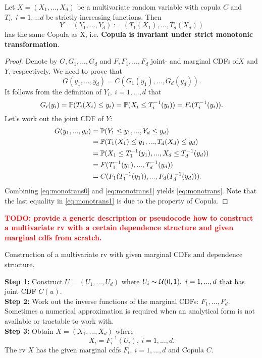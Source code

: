 \begin{thm}
	Let $X=(X_1,...,X_d)$ be a multivariate random variable with copula $C$ and $T_i,\ i=1,...d$ be strictly increasing functions. Then 
	\[Y = (Y_1, ..., Y_d) := (T_1(X_1), ..., T_d(X_d))\]
	has the same Copula as X, i.e. {\bf Copula is invariant under strict monotonic transformation}.
	
\end{thm}
\begin{proof}
	Denote by $G, G_1,..., G_d$ and $F, F_1, ...,F_d$ joint- and marginal CDFs of$X$ and $Y$, respectively. We need to prove that
	\begin{equation} \label{eq:monotrans}
		G(y_1, ..., y_d) = C(G_1(y_1),...,G_d(y_d)).
	\end{equation}
It follows from the definition of $Y_i, \ i=1,...,d$ that 
	\begin{equation} \label{eq:monotrans0}
			G_i(y_i) =  \mathbb{P}(T_i(X_i) \le y_i ) = \mathbb{P}(X_i \le T_i^{-1}(y_i)) = F_i(T_i^{-1}(y_i)).
	\end{equation}
 Let's work out the joint CDF of $Y$:
 \begin{align}
 	\label{eq:monotrans1}
 \nonumber	G(y_1, ..., y_d)& = \mathbb{P}(Y_1 \le y_1, ..., Y_d \le y_d) \\ \nonumber
 	&= \mathbb{P}(T_1(X_1)\le y_1,..., T_d(X_d)\le y_d) \\ \nonumber
 	&= \mathbb{P}(X_1 \le T_1^{-1}(y_1),...,X_d \le T_d^{-1}(y_d))\\ \nonumber
 	&= F(T_1^{-1}(y_1),..., T_d^{-1}(y_d))\\
 	& = C(F_1(T_1^{-1}(y_1)),...,F_d(T_d^{-1}(y_d))).
 \end{align}
Combining \eqref{eq:monotrans0} and \eqref{eq:monotrans1} yields \eqref{eq:monotrans}. Note that the last equality in \eqref{eq:monotrans1} is due to the property of Copula.
\end{proof}
\textcolor{red}{\bf TODO: provide a generic description or pseudocode how to construct a multivariate rv with a certain dependence structure and given marginal cdfs from scratch.}

\begin{algorithm}
	\SetAlgoLined
	\caption{Construction of a multivariate rv with given marginal CDFs and dependence structure.}
	{\bf Step 1:} Construct $U=(U_1,...,U_d)$ where $U_i\sim \mathcal{U}(0,1), \ i=1,..., d$ that has joint CDF $C(u)$.\\
	{\bf Step 2:} Work out the inverse functions of the marginal CDFs: $F_1,..., F_d$. Sometimes a numerical approximation is required when an analytical form is not available or tractable to work with.\\
	{\bf Step 3:} Obtain $X=(X_1,..., X_d)$ where 
	\begin{equation}
		X_i = F_i^{-1}(U_i), \ i=1,...,d.
	\end{equation}
	The rv $X$ has the given marginal cdfs $F_i,\ i=1,...,d$ and Copula $C$.
	\label{algo:genericsim}
\end{algorithm}

